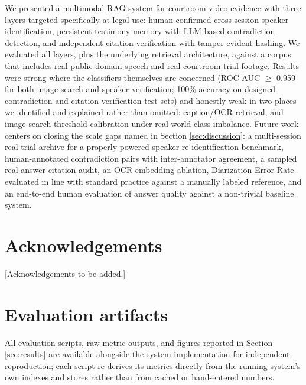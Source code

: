 \documentclass[3p,times,procedia]{elsarticle}
\begin{document}
We presented a multimodal RAG system for courtroom video evidence with three layers
targeted specifically at legal use: human-confirmed cross-session speaker
identification, persistent testimony memory with LLM-based contradiction detection, and
independent citation verification with tamper-evident hashing. We evaluated all
layers, plus the underlying retrieval architecture, against a corpus that includes real
public-domain speech and real courtroom trial footage. Results were strong where the
classifiers themselves are concerned (ROC-AUC $\geq$ 0.959 for both image search and
speaker verification; 100\% accuracy on designed contradiction and citation-verification
test sets) and honestly weak in two places we identified and explained rather than
omitted: caption/OCR retrieval, and image-search threshold calibration under real-world
class imbalance. Future work centers on closing the scale gaps named in Section
\ref{sec:discussion}: a multi-session real trial archive for a properly powered speaker
re-identification benchmark, human-annotated contradiction pairs with inter-annotator
agreement, a sampled real-answer citation audit, an OCR-embedding ablation, Diarization
Error Rate evaluated in line with standard practice \cite{ryant2020dihard} against a
manually labeled reference, and an end-to-end human evaluation of answer quality against
a non-trivial baseline system.

\section*{Acknowledgements}

[Acknowledgements to be added.]

\appendix
\section{Evaluation artifacts}
\label{app:artifacts}
All evaluation scripts, raw metric outputs, and figures reported in Section
\ref{sec:results} are available alongside the system implementation for independent
reproduction; each script re-derives its metrics directly from the running system's
own indexes and stores rather than from cached or hand-entered numbers.
\end{document}
